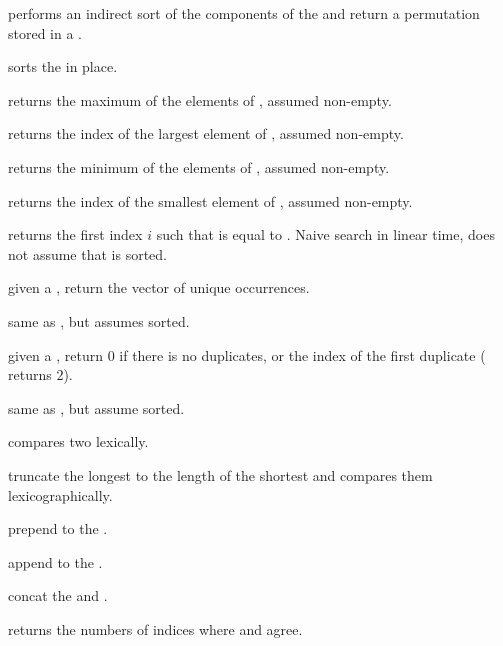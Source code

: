  performs an indirect sort of the
components of the   and return a permutation stored in a
.

 sorts the   in place.

 returns the maximum of the elements of
 , assumed non-empty.

 returns the index of the largest
element of  , assumed non-empty.

 returns the minimum of the elements of
 , assumed non-empty.

 returns the index of the smallest
element of  , assumed non-empty.

 returns the first index $i$
such that  is equal to . Naive search in linear time, does
not assume that  is sorted.

 given a  , return
the vector of unique occurrences.

 same as , but assumes
  sorted.

 given a  , return
$0$ if there is no duplicates, or the index of the first duplicate
( returns $2$).

 same as
, but assume  sorted.

 compares two  lexically.

 truncate the longest 
to the length of the shortest and compares them lexicographically.

 prepend  to the
 .

 append  to the
 .

 concat the  
and .

 returns the numbers of indices
where  and  agree.

